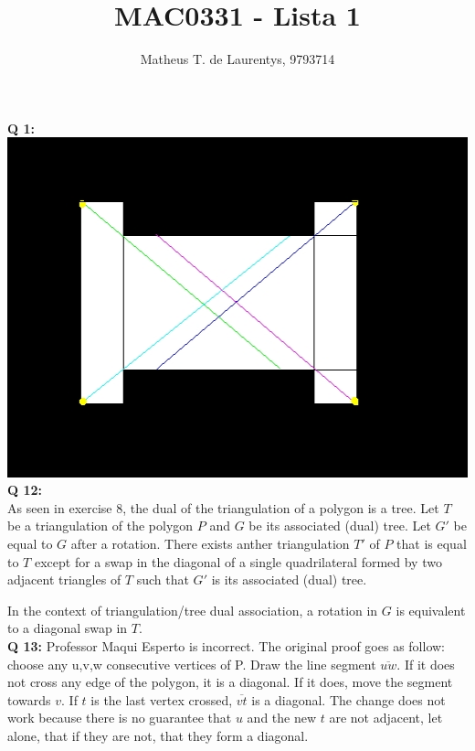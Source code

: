 \documentclass[]{article}
\title{\vspace{-4.0cm}MAC0331 - Lista 1}
\author{Matheus T. de Laurentys, 9793714}
\begin{document}
	\maketitle
	\noindent
	\textbf{Q 1:} \\
	\includegraphics[scale=0.8]{lista2im.jpeg} \\
	\textbf{Q 12:} \\
	As seen in exercise 8, the dual of the triangulation of a polygon is a tree. Let $T$ be a triangulation of the polygon $P$ and $G$ be its associated (dual) tree. Let $G'$ be equal to $G$ after a rotation. There exists anther triangulation $T'$ of $P$ that is equal to $T$ except for a swap in the diagonal of a single quadrilateral formed by two adjacent triangles of $T$ such that $G'$ is its associated (dual) tree.
	
	In the context of triangulation/tree dual association, a rotation in $G$ is equivalent to a diagonal swap in $T$. \\
	\textbf{Q 13:}
	Professor Maqui Esperto is incorrect. The original proof goes as follow: choose any u,v,w consecutive vertices of P. Draw the line segment $\overline{uw}$. If it does not cross any edge of the polygon, it is a diagonal. If it does, move the segment towards $v$. If $t$ is the last vertex crossed, $\overline{vt}$ is a diagonal. The change does not work because there is no guarantee that $u$ and the new $t$ are not adjacent, let alone, that if they are not, that they form a diagonal.
\end{document}
